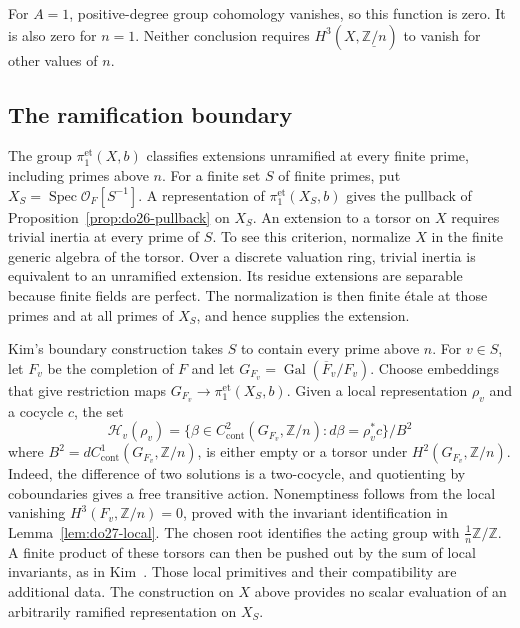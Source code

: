 For \(A=1\), positive-degree group cohomology vanishes, so this function
is zero.  It is also zero for \(n=1\).  Neither conclusion requires
\(H^3(X,\underline{\mathbb Z/n})\) to vanish for other values of \(n\).

\subsection{The ramification boundary}

The group \(\pi_1^{\mathrm{et}}(X,b)\) classifies extensions
unramified at every finite prime, including primes above \(n\).
For a finite set \(S\) of finite primes, put
\(X_S=\operatorname{Spec}\mathcal O_F[S^{-1}]\).
A representation of \(\pi_1^{\mathrm{et}}(X_S,b)\) gives the
pullback of Proposition~\ref{prop:do26-pullback} on \(X_S\).
An extension to a torsor on \(X\) requires trivial inertia at every
prime of \(S\).  To see this criterion, normalize \(X\) in the
finite generic algebra of the torsor.  Over a discrete valuation ring,
trivial inertia is equivalent to an unramified extension.  Its residue
extensions are separable because finite fields are perfect.  The
normalization is then finite \'etale at those primes and at all primes
of \(X_S\), and hence supplies the extension.

Kim's boundary construction takes \(S\) to contain every prime above
\(n\). For \(v\in S\), let \(F_v\) be the completion of \(F\)
and let \(G_{F_v}=\operatorname{Gal}(\overline F_v/F_v)\). Choose
embeddings that give restriction maps
\(G_{F_v}\to\pi_1^{\mathrm{et}}(X_S,b)\). Given a local
representation \(\rho_v\) and a cocycle \(c\), the set
\[
 \mathcal H_v(\rho_v)=
 \{\beta\in C^2_{\mathrm{cont}}(G_{F_v},\mathbb Z/n):
                      d\beta=\rho_v^*c\}/B^2
\]
where \(B^2=dC^1_{\mathrm{cont}}(G_{F_v},\mathbb Z/n)\),
is either empty or a torsor under
\(H^2(G_{F_v},\mathbb Z/n)\).  Indeed, the difference of two
solutions is a two-cocycle, and quotienting by coboundaries gives a
free transitive action.  Nonemptiness follows from the local vanishing
\(H^3(F_v,\mathbb Z/n)=0\), proved with the invariant
identification in Lemma~\ref{lem:do27-local}. The chosen root
identifies the acting group with \(\tfrac1n\mathbb Z/\mathbb Z\).
A finite product of these torsors can then be pushed out by the
sum of local invariants, as in
Kim~\cite[\S2, pp.~4--6]{Kim2016}.
Those local primitives and their compatibility are additional data.
The construction on \(X\) above provides no scalar evaluation of an
arbitrarily ramified representation on \(X_S\).

